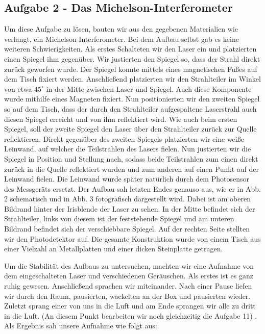 \subsection*{Aufgabe 2 - Das Michelson-Interferometer}
Um diese Aufgabe zu lösen, bauten wir aus den gegebenen Materialien wie verlangt, ein Michelson-Interferometer. Bei dem Aufbau selbst gab es keine weiteren Schwierigkeiten. 
Als erstes Schalteten wir den Laser ein und platzierten einen Spiegel ihm gegenüber. Wir justierten den Spiegel so, dass der Strahl direkt zurück geworfen wurde. Der Spiegel konnte mittels eines magnetischen Fußes auf dem Tisch fixiert werden. Anschließend platzierten wir den Strahlteiler im Winkel von etwa $45^{\circ}$ in der Mitte zwischen Laser und Spiegel. Auch diese Komponente wurde mithilfe eines Magneten fixiert.
Nun positionierten wir den zweiten Spiegel so auf dem Tisch, dass der durch den Strahlteiler aufgespaltene Laserstrahl auch diesen Spiegel erreicht und von ihm reflektiert wird. Wie auch beim ersten Spiegel, soll der zweite Spiegel den Laser über den Strahlteiler zurück zur Quelle reflektieren.
Direkt gegenüber des zweiten Spiegels platzierten wir eine weiße Leinwand, auf welcher die Teilstrahlen des Lasers fielen. Nun justierten wir die Spiegel in Position und Stellung nach, sodass beide Teilstrahlen zum einen direkt zurück in die Quelle reflektiert wurden und zum anderen auf einen Punkt auf der Leinwand fielen. 
Die Leinwand wurde später natürlich durch dem Photosensor des Messgeräts ersetzt.
Der Aufbau sah letzten Endes genauso aus, wie er in Abb. 2 schematisch und in Abb. 3 fotografisch dargestellt wird. Dabei ist am oberen Bildrand hinter der Irisblende der Laser zu sehen. In der Mitte befindet sich der Strahlteiler, links von diesem ist der feststehende Spiegel und am unteren Bildrand befindet sich der verschiebbare Spiegel. Auf der rechten Seite stellten wir den Photodetektor auf. Die gesamte Konstruktion wurde von einem Tisch aus einer Vielzahl an Metallplatten und einer dicken Steinplatte getragen.


Um die Stabilität des Aufbaus zu untersuchen, machten wir eine Aufnahme von dem eingeschalteten Laser und verschiedenen Geräuschen. Als erstes ist es ganz ruhig gewesen. Anschließend sprachen wir miteinander. Nach einer Pause liefen wir durch den Raum, pausierten, wackelten an der Box und pausierten wieder. Zuletzt sprang einer von uns in die Luft und am Ende sprangen wir alle zu dritt in die Luft. (An diesem Punkt bearbeiten wir noch gleichzeitig die Aufgabe 11) .
Als Ergebnis sah unsere Aufnahme wie folgt aus:

